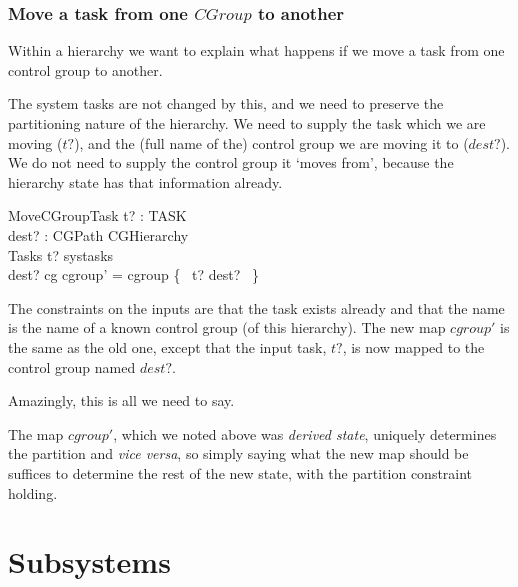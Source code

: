 \documentclass[a4paper,twoside,12pt]{article}
\begin{document}
\subsubsection*{Move a task from one $CGroup$ to another}

Within a hierarchy we want to explain what happens if we move a task from one control group to another.

The system tasks are not changed by this, and we need to preserve the partitioning nature of the hierarchy. We need to supply the task which we are moving ($t?$), and the (full name of the) control group we are moving it to ($dest?$). We do not need to supply the control group it `moves from', because the hierarchy state has that information already.

\begin{schema}{MoveCGroupTask}
t? : TASK \\
dest? : CGPath
\also
\Delta CGHierarchy \\
\Xi Tasks 
\where
t? \in systasks \\
dest? \in \dom cg
\also
cgroup' = cgroup \oplus \{ ~t? \mapsto dest? ~\}
\end{schema}
The constraints on the inputs are that the task exists already and that the name is the name of a known control group (of this hierarchy). The new map $cgroup'$ is the same as the old one, except that the input task, $t?$, is now mapped to the control group named $dest?$.

Amazingly, this is all we need to say.  

The map $cgroup'$, which we noted above was \emph{derived state}, uniquely determines the partition 
and \emph{vice versa}, so simply saying what the new map should be suffices to determine the rest of the new state, with the partition constraint holding.

\section{Subsystems}

\clearpage

\appendix
\end{document}
